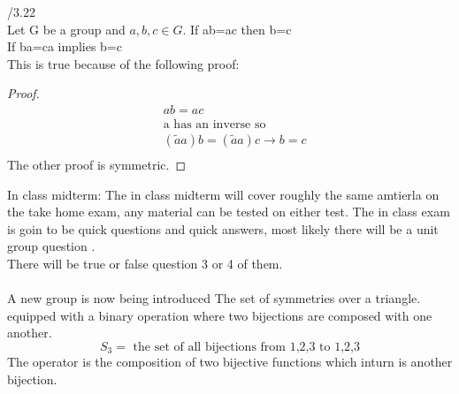 \documentclass[11pt]{article}
\theoremstyle{definition}  %
\begin{document}
/3.22\\
Let G be a group and $ a,b,c\in G $.
If ab=ac then b=c\\
If ba=ca implies b=c\\
This is true because of the following proof:
\begin{proof}
  \begin{align*}
    &ab=ac\\
    &\text{a has an inverse so}\\
    &(\tilde{a}a)b=(\tilde{a}a)c\rightarrow b=c\\
  \end{align*}
  The other proof is symmetric.
\end{proof}


In class midterm:
The in class midterm will cover roughly the same amtierla on the take home exam, any material can be tested on either test. The in class exam is goin to be quick questions and quick answers, most likely there will be a unit group question . \\
There will be true or false question 3 or 4 of them. \\
\\
A new group is now being introduced
The set of symmetries over a triangle. equipped with a binary operation where two bijections are composed with one another. \\
\[
  S_3=\text{ the set of all bijections from 1,2,3 to 1,2,3}
\]
The operator is the composition of two bijective functions which inturn is another bijection.
\end{document}
